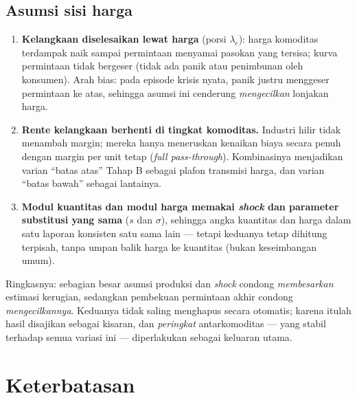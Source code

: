 \documentclass[
  manuscript=article,
  layout=publish,
  year=2026,
  volume=1,
]{den}
\providecommand{\tightlist}{%
  \setlength{\itemsep}{0pt}\setlength{\parskip}{0pt}}
\begin{document}
\subsection{Asumsi sisi harga}\label{asumsi-sisi-harga}

\begin{enumerate}
\def\labelenumi{\arabic{enumi}.}
\setcounter{enumi}{10}
\tightlist
\item
  \textbf{Kelangkaan diselesaikan lewat harga} (porsi \(\lambda_c\)):
  harga komoditas terdampak naik sampai permintaan menyamai pasokan yang
  tersisa; kurva permintaan tidak bergeser (tidak ada panik atau
  penimbunan oleh konsumen). Arah bias: pada episode krisis nyata, panik
  justru menggeser permintaan ke atas, sehingga asumsi ini cenderung
  \emph{mengecilkan} lonjakan harga.
\item
  \textbf{Rente kelangkaan berhenti di tingkat komoditas.} Industri
  hilir tidak menambah margin; mereka hanya meneruskan kenaikan biaya
  secara penuh dengan margin per unit tetap (\emph{full pass-through}).
  Kombinasinya menjadikan varian ``batas atas'' Tahap B sebagai plafon
  transmisi harga, dan varian ``batas bawah'' sebagai lantainya.
\item
  \textbf{Modul kuantitas dan modul harga memakai \emph{shock} dan
  parameter substitusi yang sama} (\(s\) dan \(\sigma\)), sehingga angka
  kuantitas dan harga dalam satu laporan konsisten satu sama lain ---
  tetapi keduanya tetap dihitung terpisah, tanpa umpan balik harga ke
  kuantitas (bukan keseimbangan umum).
\end{enumerate}

Ringkasnya: sebagian besar asumsi produksi dan \emph{shock} condong
\emph{membesarkan} estimasi kerugian, sedangkan pembekuan permintaan
akhir condong \emph{mengecilkannya}. Keduanya tidak saling menghapus
secara otomatis; karena itulah hasil disajikan sebagai kisaran, dan
\emph{peringkat} antarkomoditas --- yang stabil terhadap semua variasi
ini --- diperlakukan sebagai keluaran utama.

\section{Keterbatasan}\label{sec-limit}
\end{document}
